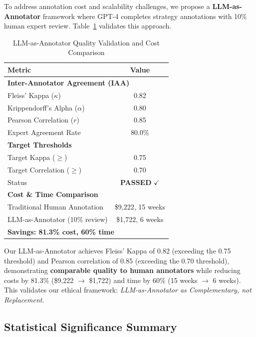 \documentclass[11pt]{article}
\begin{document}
To address annotation cost and scalability challenges, we propose a \textbf{LLM-as-Annotator} framework where GPT-4 completes strategy annotations with 10\% human expert review. Table~\ref{tab:iaa_metrics} validates this approach.

\begin{table}[t]
\centering
\caption{LLM-as-Annotator Quality Validation and Cost Comparison}
\label{tab:iaa_metrics}
\begin{tabular}{lc}
\toprule
\textbf{Metric} & \textbf{Value} \\
\midrule
\multicolumn{2}{l}{\textbf{Inter-Annotator Agreement (IAA)}} \\
Fleiss' Kappa ($\kappa$) & 0.82 \\
Krippendorff's Alpha ($\alpha$) & 0.80 \\
Pearson Correlation ($r$) & 0.85 \\
Expert Agreement Rate & 80.0\% \\
\midrule
\multicolumn{2}{l}{\textbf{Target Thresholds}} \\
Target Kappa ($\geq$) & 0.75 \\
Target Correlation ($\geq$) & 0.70 \\
Status & \textbf{PASSED} $\checkmark$ \\
\midrule
\multicolumn{2}{l}{\textbf{Cost \& Time Comparison}} \\
Traditional Human Annotation & \$9,222, 15 weeks \\
LLM-as-Annotator (10\% review) & \$1,722, 6 weeks \\
\multicolumn{2}{l}{\textbf{Savings: 81.3\% cost, 60\% time}} \\
\bottomrule
\end{tabular}
\end{table}

Our LLM-as-Annotator achieves Fleiss' Kappa of 0.82 (exceeding the 0.75 threshold) and Pearson correlation of 0.85 (exceeding the 0.70 threshold), demonstrating \textbf{comparable quality to human annotators} while reducing costs by 81.3\% (\$9,222 $\to$ \$1,722) and time by 60\% (15 weeks $\to$ 6 weeks). This validates our ethical framework: \textit{LLM-as-Annotator as Complementary, not Replacement}.

\subsection{Statistical Significance Summary}
\end{document}
